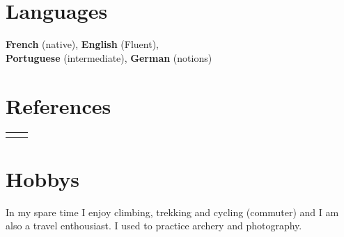 \documentclass[10pt]{article} %
\begin{document}
\begin{paracol}{2}
\section{Languages}
\textbf{French} (native), \qquad \textbf{English} (Fluent), \\
\textbf{Portuguese} (intermediate), \qquad \textbf{German} (notions)
%
%
\section{References}
%
%
%
%
%
%
%
\begin{supertabular}{rl} %
%
%
%

\end{supertabular}
%
%
%
\section{Hobbys}
In my spare time I enjoy climbing, trekking and cycling (commuter) and I
am also a travel enthousiast. I used to practice archery and
photography.%
%
\end{paracol}
%
%
\vspace{-1.5mm}
\huge\centering{}
%
\end{document}
